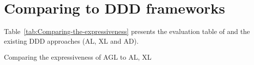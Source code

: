 \section{Comparing to DDD frameworks} \label{apex:compareAGLwithOther}


Table~\ref{tab:Comparing-the-expressiveness} presents the evaluation table of \agldcsl and the existing DDD approaches (AL, XL and AD). 

	\begin{table*}[ht]
	\centering
	\caption{Comparing the expressiveness of AGL to AL, XL} \label{tab:Comparing-the-expressiveness}
	\footnotesize
	\setlength\tabcolsep{1pt}
\end{table*}
